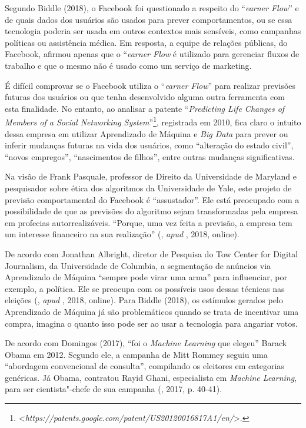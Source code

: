 Segundo Biddle (2018), o Facebook foi questionado a respeito do
``\emph{earner Flow}'' e de quais dados dos usuários são usados para
prever comportamentos, ou se essa tecnologia poderia ser usada em outros
contextos mais sensíveis, como campanhas políticas ou assistência
médica. Em resposta, a equipe de relações públicas, do Facebook, afirmou
apenas que o ``\emph{earner Flow} é utilizado para gerenciar fluxos
de trabalho e que o mesmo não é usado como um serviço de marketing.

É difícil comprovar se o Facebook utiliza o ``\emph{earner Flow}''
para realizar previsões futuras dos usuários ou que tenha desenvolvido
alguma outra ferramenta com esta finalidade. No entanto, ao analisar a
patente ``\emph{Predicting Life Changes of Members of a Social
Networking System}''\footnote{\textless{}\emph{https://patents.google.com/patent/US20120016817A1/en/}\textgreater{}.},
registrada em 2010, fica claro o intuito dessa empresa em utilizar
Aprendizado de Máquina e \emph{Big Data} para prever ou inferir mudanças
futuras na vida dos usuários, como ``alteração do estado civil'',
``novos empregos'', ``nascimentos de filhos'', entre outras mudanças
significativas.

Na visão de Frank Pasquale, professor de Direito da Universidade de
Maryland e pesquisador sobre ética dos algoritmos da Universidade de
Yale, este projeto de previsão comportamental do Facebook é
``assustador''. Ele está preocupado com a possibilidade de que as
previsões do algoritmo sejam transformadas pela empresa em profecias
autorrealizáveis. ``Porque, uma vez feita a previsão, a empresa tem um
interesse financeiro na sua realização'' (, \emph{apud} , 2018,
online).

De acordo com Jonathan Albright, diretor de Pesquisa do Tow Center for
Digital Journalism, da Universidade de Columbia, a segmentação de
anúncios via Aprendizado de Máquina ``sempre pode virar uma arma'' para
influenciar, por exemplo, a política. Ele se preocupa com os possíveis
usos dessas técnicas nas eleições (, \emph{apud} , 2018, online).
Para Biddle (2018), os estímulos gerados pelo Aprendizado de Máquina já
são problemáticos quando se trata de incentivar uma compra, imagina o
quanto isso pode ser ao usar a tecnologia para angariar votos.

De acordo com Domingos (2017), ``foi o \emph{Machine Learning} que
elegeu'' Barack Obama em 2012. Segundo ele, a campanha de Mitt Rommey
seguiu uma ``abordagem convencional de consulta'', compilando os
eleitores em categorias genéricas. Já Obama, contratou Rayid Ghani,
especialista em \emph{Machine Learning}, para ser cientista"-chefe de sua
campanha (, 2017, p. 40-41).

